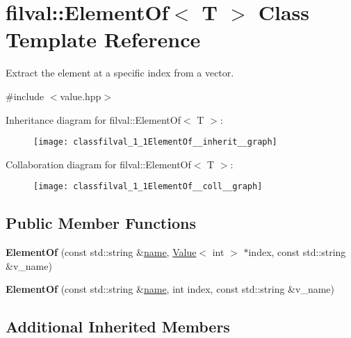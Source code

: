 \hypertarget{classfilval_1_1ElementOf}{}\section{filval\+:\+:Element\+Of$<$ T $>$ Class Template Reference}
\label{classfilval_1_1ElementOf}


Extract the element at a specific index from a vector.  




{\ttfamily \#include $<$value.\+hpp$>$}



Inheritance diagram for filval\+:\+:Element\+Of$<$ T $>$\+:
\nopagebreak
\begin{figure}[H]
\begin{center}
\leavevmode
\texttt{[image: classfilval\_1\_1ElementOf\_\_inherit\_\_graph]}
\end{center}
\end{figure}


Collaboration diagram for filval\+:\+:Element\+Of$<$ T $>$\+:
\nopagebreak
\begin{figure}[H]
\begin{center}
\leavevmode
\texttt{[image: classfilval\_1\_1ElementOf\_\_coll\_\_graph]}
\end{center}
\end{figure}
\subsection*{Public Member Functions}
\begin{DoxyCompactItemize}
\item 
\hypertarget{classfilval_1_1ElementOf_aeff876e829a64f276859a8aaf3c2bcdb}{}\label{classfilval_1_1ElementOf_aeff876e829a64f276859a8aaf3c2bcdb} 
{\bfseries Element\+Of} (const std\+::string \&\hyperlink{classfilval_1_1GenValue_a007e38c03ee041c2a657afa3d6e91ab1}{name}, \hyperlink{classfilval_1_1Value}{Value}$<$ int $>$ $\ast$index, const std\+::string \&v\+\_\+name)
\item 
\hypertarget{classfilval_1_1ElementOf_a277e5db653a2cc2e5b7fecd130bcac30}{}\label{classfilval_1_1ElementOf_a277e5db653a2cc2e5b7fecd130bcac30} 
{\bfseries Element\+Of} (const std\+::string \&\hyperlink{classfilval_1_1GenValue_a007e38c03ee041c2a657afa3d6e91ab1}{name}, int index, const std\+::string \&v\+\_\+name)
\end{DoxyCompactItemize}
\subsection*{Additional Inherited Members}


